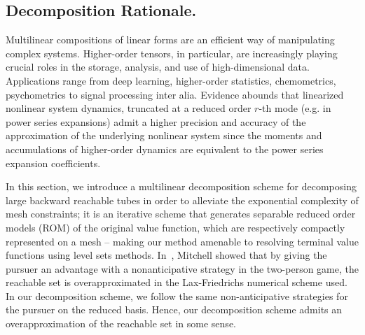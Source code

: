 \subsection{Decomposition Rationale.}
Multilinear compositions of linear forms are an efficient way of manipulating complex systems.   Higher-order tensors, in particular, are increasingly playing crucial roles in the storage, analysis, and use of high-dimensional data. Applications range from deep learning, higher-order statistics, chemometrics, psychometrics to signal processing inter alia. Evidence abounds that linearized nonlinear system dynamics, truncated at a reduced order $r$-th mode (e.g. in power series expansions\cite{iDG, JacobsonMayne, Mitter1966, McReynolds1967}) admit a higher precision and accuracy of the approximation of the underlying nonlinear system since the moments and accumulations of higher-order dynamics are equivalent to the power series expansion coefficients.  



In this section, we introduce a multilinear decomposition scheme for decomposing large backward reachable tubes in order to alleviate the exponential complexity of mesh constraints; it is an iterative scheme that generates separable reduced order models (ROM) of the original value function, which are respectively compactly represented on a mesh -- making our method amenable to resolving terminal value functions using level sets methods. 
In~\cite{Mitchell2005}, Mitchell showed that by giving the pursuer an advantage with a  nonanticipative strategy in the two-person game, the reachable set is overapproximated in the Lax-Friedrichs numerical scheme used. In our decomposition scheme, we follow the same non-anticipative strategies for the pursuer on the reduced basis. Hence, our decomposition scheme admits an overapproximation of the reachable set in some sense.



